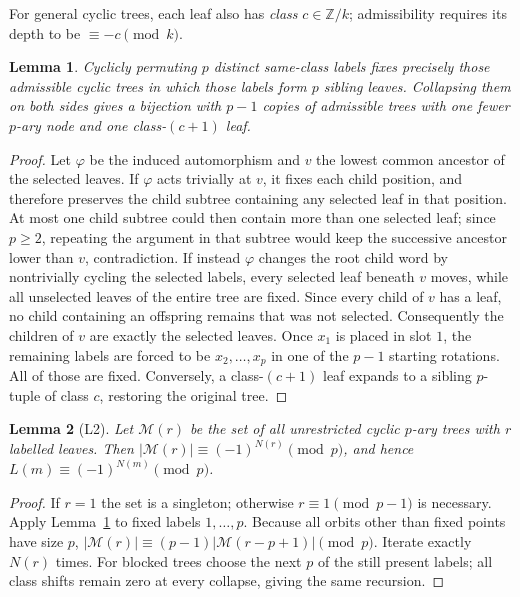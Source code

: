 \documentclass[10pt]{article}
\newtheorem{lemma}{Lemma}
\theoremstyle{definition}\newtheorem*{definition}{Definition}
\theoremstyle{remark}\newtheorem*{remark}{Remark}
\begin{document}
For general cyclic trees, each leaf also has \emph{class} $c\in\mathbb Z/k$;
admissibility requires its depth to be $\equiv-c\pmod k$.
\begin{lemma}\label{cherry} Cyclicly permuting $p$ distinct same-class labels
fixes precisely those admissible cyclic trees in which those labels form
$p$ sibling leaves. Collapsing them on both sides gives a bijection with $p-1$
copies of admissible trees with one fewer $p$-ary node and one class-$(c+1)$
leaf.\end{lemma}
\begin{proof} Let $\varphi$ be the induced automorphism and $v$ the lowest common
ancestor of the selected leaves. If $\varphi$ acts trivially at $v$, it fixes
each child position, and therefore preserves the child subtree containing
any selected leaf in that position. At most one child subtree could then
contain more than one selected leaf; since $p\ge2$, repeating the argument in
that subtree would keep the successive ancestor lower than $v$, contradiction.
If instead $\varphi$ changes the root child word by nontrivially cycling the
selected labels, every selected leaf beneath $v$ moves, while all unselected
leaves of the entire tree are fixed. Since every child of $v$ has a leaf, no
child containing an offspring remains that was not selected. Consequently
the children of $v$ are exactly the selected leaves. Once $x_1$ is placed
in slot $1$, the remaining labels are forced to be $x_2,\ldots,x_p$ in one of
the $p-1$ starting rotations. All of those are fixed. Conversely, a
class-$(c+1)$ leaf expands to a sibling $p$-tuple of class $c$, restoring
the original tree.\end{proof}

\begin{lemma}[L2]\label{L2} Let $\mathcal M(r)$ be the set of all unrestricted
cyclic $p$-ary trees with $r$ labelled leaves. Then
$|\mathcal M(r)|\equiv(-1)^{N(r)}\pmod p$, and hence
$L(m)\equiv(-1)^{N(m)}\pmod p$.\end{lemma}
\begin{proof} If $r=1$ the set is a singleton; otherwise $r\equiv1\pmod{p-1}$
is necessary. Apply Lemma~\ref{cherry} to fixed labels $1,\ldots,p$. Because
all orbits other than fixed points have size $p$,
$|\mathcal M(r)|\equiv(p-1)|\mathcal M(r-p+1)|\pmod p$. Iterate exactly
$N(r)$ times. For blocked trees choose the next $p$ of the still present labels;
all class shifts remain zero at every collapse, giving the same recursion.\end{proof}
\end{document}
